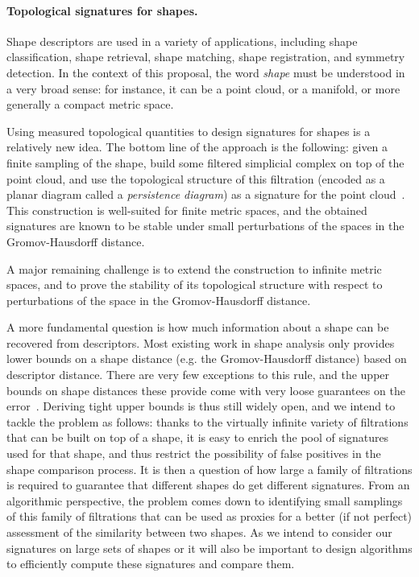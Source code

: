\paragraph{Topological signatures for shapes.}

Shape descriptors are used in a variety of applications, including
shape classification, shape retrieval, shape matching, shape
registration, and symmetry detection. In the context of this proposal,
the word {\em shape} must be understood in a very broad sense: for
instance, it can be a point cloud, or a
manifold, or more generally a compact metric space.

Using measured topological quantities to design signatures for shapes
is a relatively new idea. The bottom line of the approach is the
following: given a finite sampling of the shape, build some filtered
simplicial complex on top of the point cloud, and use the topological
structure of this filtration (encoded as a planar diagram called a
{\em persistence diagram}) as a signature for the point
cloud~\cite{ccgmo-ghsssp-09, socg-pbsds-10}. This construction is
well-suited for finite metric spaces, and the obtained signatures are
known to be stable under small perturbations of the spaces in the
Gromov-Hausdorff distance.  

A major remaining challenge is to extend the
construction to infinite metric spaces, and to prove the stability of
its topological structure with respect to perturbations of the space
in the Gromov-Hausdorff distance.

A more fundamental question is how much information about a shape can
be recovered from descriptors. Most existing work in shape analysis
only provides lower bounds on a shape distance (e.g. the
Gromov-Hausdorff distance) based on descriptor distance. There are
very few exceptions to this rule, and the upper bounds on shape
distances these provide come with very loose guarantees on the
error~\cite{bbk-gmds-06,ms-gh-05}. Deriving tight upper bounds is
thus still widely open, and we intend to tackle the problem as
follows: thanks to the virtually infinite variety of filtrations that
can be built on top of a shape, it is easy to enrich the pool of
signatures used for that shape, and thus restrict the possibility of
false positives in the shape comparison process. It is then a question
of how large a family of filtrations is required to guarantee that
different shapes do get different signatures. From an algorithmic
perspective, the problem comes down to identifying small samplings of this
family of filtrations that can be used as proxies for a better (if not
perfect) assessment of the similarity between two shapes.  As we
intend to consider our signatures on large sets of shapes or it will
also be important to design algorithms to efficiently compute these
signatures and compare them. 

